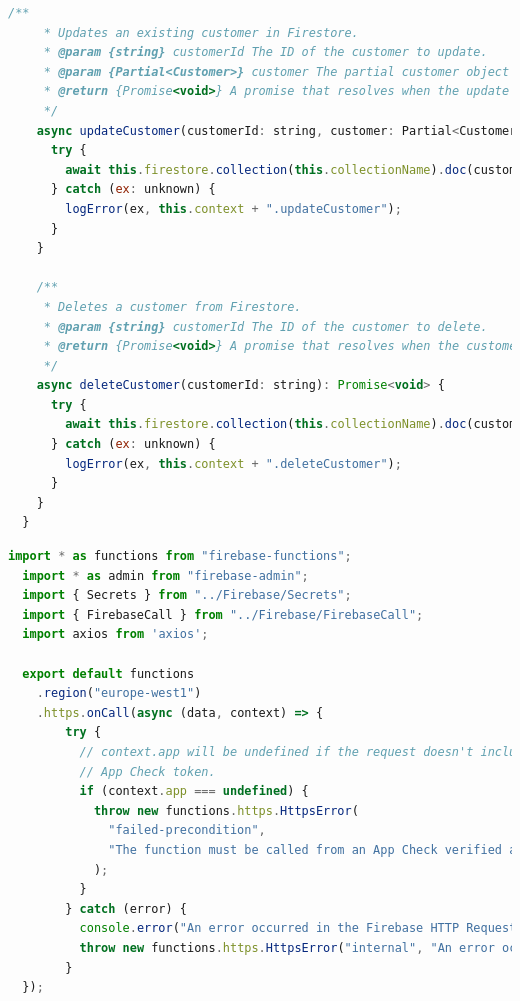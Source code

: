 \begin{lstlisting}[language=JavaScript, caption={Example of Class and Interface defined in Models}]
    /**
     * Updates an existing customer in Firestore.
     * @param {string} customerId The ID of the customer to update.
     * @param {Partial<Customer>} customer The partial customer object containing updates.
     * @return {Promise<void>} A promise that resolves when the update is complete.
     */
    async updateCustomer(customerId: string, customer: Partial<Customer>): Promise<void> {
      try {
        await this.firestore.collection(this.collectionName).doc(customerId).update(customer);
      } catch (ex: unknown) {
        logError(ex, this.context + ".updateCustomer");
      }
    }
  
    /**
     * Deletes a customer from Firestore.
     * @param {string} customerId The ID of the customer to delete.
     * @return {Promise<void>} A promise that resolves when the customer is successfully deleted.
     */
    async deleteCustomer(customerId: string): Promise<void> {
      try {
        await this.firestore.collection(this.collectionName).doc(customerId).delete();
      } catch (ex: unknown) {
        logError(ex, this.context + ".deleteCustomer");
      }
    }
  }  
\end{lstlisting}

\begin{lstlisting}[language=JavaScript, caption={An example of Firebase HTTP Request onCall Cloud Function version 1.0}]
  import * as functions from "firebase-functions";
  import * as admin from "firebase-admin";
  import { Secrets } from "../Firebase/Secrets";
  import { FirebaseCall } from "../Firebase/FirebaseCall";
  import axios from 'axios'; 

  export default functions
    .region("europe-west1")
    .https.onCall(async (data, context) => {
        try {
          // context.app will be undefined if the request doesn't include a valid
          // App Check token.
          if (context.app === undefined) {
            throw new functions.https.HttpsError(
              "failed-precondition",
              "The function must be called from an App Check verified app."
            );
          } 
        } catch (error) {
          console.error("An error occurred in the Firebase HTTP Request onCall Cloud Function: ", error);
          throw new functions.https.HttpsError("internal", "An error occurred while processing the request.");
        }
  });
\end{lstlisting}

